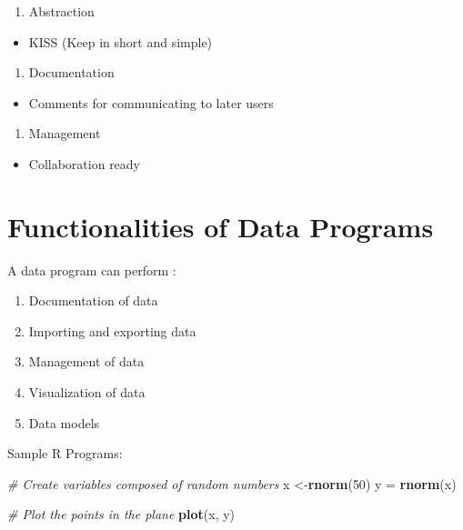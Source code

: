 \documentclass[]{book}
\newenvironment{Shaded}{\begin{snugshade}}{\end{snugshade}}
\newcommand{\CommentTok}[1]{\textcolor[rgb]{0.56,0.35,0.01}{\textit{#1}}}
\newcommand{\DecValTok}[1]{\textcolor[rgb]{0.00,0.00,0.81}{#1}}
\newcommand{\KeywordTok}[1]{\textcolor[rgb]{0.13,0.29,0.53}{\textbf{#1}}}
\newcommand{\NormalTok}[1]{#1}
\newcommand{\StringTok}[1]{\textcolor[rgb]{0.31,0.60,0.02}{#1}}
\providecommand{\tightlist}{%
  \setlength{\itemsep}{0pt}\setlength{\parskip}{0pt}}
\begin{document}
\begin{enumerate}
\def\labelenumi{\arabic{enumi}.}
\setcounter{enumi}{4}
\tightlist
\item
  Abstraction
\end{enumerate}

\begin{itemize}
\tightlist
\item
  KISS (Keep in short and simple)
\end{itemize}

\begin{enumerate}
\def\labelenumi{\arabic{enumi}.}
\setcounter{enumi}{5}
\tightlist
\item
  Documentation
\end{enumerate}

\begin{itemize}
\tightlist
\item
  Comments for communicating to later users
\end{itemize}

\begin{enumerate}
\def\labelenumi{\arabic{enumi}.}
\setcounter{enumi}{6}
\tightlist
\item
  Management
\end{enumerate}

\begin{itemize}
\tightlist
\item
  Collaboration ready
\end{itemize}

\hypertarget{functionalities-of-data-programs}{%
\section{Functionalities of Data Programs}\label{functionalities-of-data-programs}}

A data program can perform :

\begin{enumerate}
\def\labelenumi{\arabic{enumi}.}
\tightlist
\item
  Documentation of data
\item
  Importing and exporting data
\item
  Management of data
\item
  Visualization of data
\item
  Data models
\end{enumerate}

Sample R Programs:

\begin{Shaded}
\begin{Highlighting}[]
\CommentTok{# Create variables composed of random numbers}
\NormalTok{x <-}\KeywordTok{rnorm}\NormalTok{(}\DecValTok{50}\NormalTok{) }
\NormalTok{y =}\StringTok{ }\KeywordTok{rnorm}\NormalTok{(x)}

\CommentTok{# Plot the points in the plane }
\KeywordTok{plot}\NormalTok{(x, y)}
\end{Highlighting}
\end{Shaded}
\end{document}

